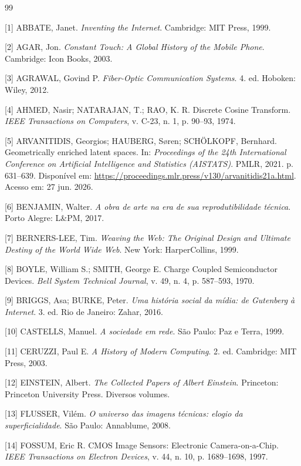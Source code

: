 \documentclass{hipatia}
\begin{document}
{\fontsize{11}{11}\selectfont
\begin{thebibliography}{99}

[1]
ABBATE, Janet.
\textit{Inventing the Internet}.
Cambridge: MIT Press, 1999.

[2]
AGAR, Jon.
\textit{Constant Touch: A Global History of the Mobile Phone}.
Cambridge: Icon Books, 2003.

[3]
AGRAWAL, Govind P.
\textit{Fiber-Optic Communication Systems}.
4. ed.
Hoboken: Wiley, 2012.

[4]
AHMED, Nasir; NATARAJAN, T.; RAO, K. R.
Discrete Cosine Transform.
\textit{IEEE Transactions on Computers},
v. C-23, n. 1, p. 90--93, 1974.

[5]
ARVANITIDIS, Georgios; HAUBERG, Søren; SCHÖLKOPF, Bernhard.
Geometrically enriched latent spaces.
In: \textit{Proceedings of the 24th International Conference on Artificial Intelligence and Statistics (AISTATS)}.
PMLR, 2021.
p. 631--639.
Disponível em:
\url{https://proceedings.mlr.press/v130/arvanitidis21a.html}.
Acesso em: 27 jun. 2026.

[6]
BENJAMIN, Walter.
\textit{A obra de arte na era de sua reprodutibilidade técnica}.
Porto Alegre: L\&PM, 2017.

[7]
BERNERS-LEE, Tim.
\textit{Weaving the Web: The Original Design and Ultimate Destiny of the World Wide Web}.
New York: HarperCollins, 1999.

[8]
BOYLE, William S.; SMITH, George E.
Charge Coupled Semiconductor Devices.
\textit{Bell System Technical Journal},
v. 49, n. 4, p. 587--593, 1970.

[9]
BRIGGS, Asa; BURKE, Peter.
\textit{Uma história social da mídia: de Gutenberg à Internet}.
3. ed.
Rio de Janeiro: Zahar, 2016.

[10]
CASTELLS, Manuel.
\textit{A sociedade em rede}.
São Paulo: Paz e Terra, 1999.

[11]
CERUZZI, Paul E.
\textit{A History of Modern Computing}.
2. ed.
Cambridge: MIT Press, 2003.

[12]
EINSTEIN, Albert.
\textit{The Collected Papers of Albert Einstein}.
Princeton: Princeton University Press.
Diversos volumes.

[13]
FLUSSER, Vilém.
\textit{O universo das imagens técnicas: elogio da superficialidade}.
São Paulo: Annablume, 2008.

[14]
FOSSUM, Eric R.
CMOS Image Sensors: Electronic Camera-on-a-Chip.
\textit{IEEE Transactions on Electron Devices},
v. 44, n. 10, p. 1689--1698, 1997.


\end{thebibliography}}
\end{document}
